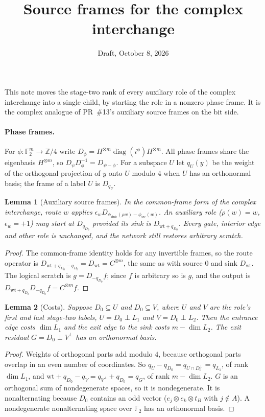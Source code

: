 \documentclass[11pt]{article}
\title{Source frames for the complex interchange}
\date{Draft, October 8, 2026}
\newtheorem{lemma}{Lemma}
\theoremstyle{remark}\newtheorem*{remark}{Remark}
\begin{document}
\maketitle

This note moves the stage-two rank of every auxiliary role of the complex interchange into a single
child, by starting the role in a nonzero phase frame. It is the complex analogue of PR~\#13's auxiliary
source frames on the bit side.

\paragraph{Phase frames.} For $\phi:\mathbb F_2^m\to\mathbb Z/4$ write $D_\phi=H^{\otimes m}\operatorname{diag}(i^{\phi})H^{\otimes m}$.
All phase frames share the eigenbasis $H^{\otimes m}$, so $D_\psi D_\phi^{-1}=D_{\psi-\phi}$. For a subspace $U$ let
$q_U(y)$ be the weight of the orthogonal projection of $y$ onto $U$ modulo $4$ when $U$ has an orthonormal basis;
the frame of a label $U$ is $D_{q_U}$.

\begin{lemma}[Auxiliary source frames]\label{lem:src}
In the common-frame form of the complex interchange, route $w$ applies $\epsilon_w D_{\phi_{\mathrm{sink}}(\rho w)-\phi_{\mathrm{src}}(w)}$.
An auxiliary role ($\rho(w)=w$, $\epsilon_w=+1$) may start at $D_{q_{D_0}}$ provided its sink is $D_{\mathrm{wt}+q_{D_0}}$.
Every gate, interior edge and other role is unchanged, and the network still restores arbitrary scratch.
\end{lemma}
\begin{proof}
The common-frame identity holds for any invertible frames, so the route operator is
$D_{\mathrm{wt}+q_{D_0}-q_{D_0}}=D_{\mathrm{wt}}=C^{\otimes m}$, the same as with source $0$ and sink $D_{\mathrm{wt}}$.
The logical scratch is $g=D_{-q_{D_0}}f$; since $f$ is arbitrary so is $g$, and the output is
$D_{\mathrm{wt}+q_{D_0}}D_{-q_{D_0}}f=C^{\otimes m}f$.
\end{proof}

\begin{lemma}[Costs]\label{lem:cost}
Suppose $D_0\subseteq U$ and $D_0\subseteq V$, where $U$ and $V$ are the role's first and last stage-two labels,
$U=D_0\perp L_1$ and $V=D_0\perp L_2$. Then the entrance edge costs $\dim L_1$ and the exit edge to the sink costs
$m-\dim L_2$. The exit residual $G=D_0\perp V^\perp$ has an orthonormal basis.
\end{lemma}
\begin{proof}
Weights of orthogonal parts add modulo $4$, because orthogonal parts overlap in an even number of coordinates.
So $q_U-q_{D_0}=q_{U\cap D_0^\perp}=q_{L_1}$, of rank $\dim L_1$, and
$\mathrm{wt}+q_{D_0}-q_V=q_{V^\perp}+q_{D_0}=q_G$, of rank $m-\dim L_2$. $G$ is an orthogonal sum of nondegenerate
spaces, so it is nondegenerate. It is nonalternating because $D_0$ contains an odd vector
($e_j\otimes e_k\otimes t_B$ with $j\notin A$). A nondegenerate nonalternating space over $\mathbb F_2$ has an orthonormal basis.
\end{proof}
\end{document}
